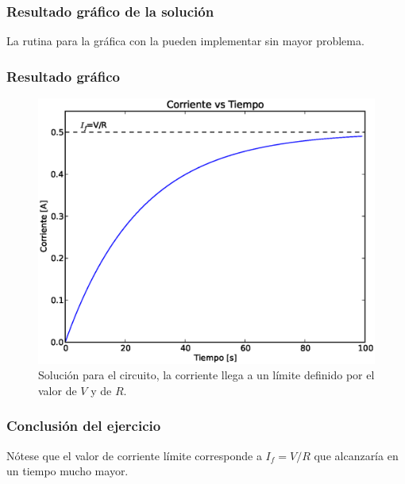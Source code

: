 \begin{frame}
\frametitle{Resultado gráfico de la solución}
La rutina para la gráfica con  la pueden implementar sin mayor problema.
\end{frame}
\begin{frame}
\frametitle{Resultado gráfico}
\begin{figure}
	\centering
	\includegraphics[scale=0.4]{Imagenes/RK2circuito.eps} 
    \caption{Solución para el circuito, la corriente llega a un límite definido por el valor de $V$ y de $R$.}
\end{figure}
\end{frame}
\begin{frame}
\frametitle{Conclusión del ejercicio}
Nótese que el valor de corriente límite corresponde a $I_{f} = V/R$ que alcanzaría en un tiempo mucho mayor.
\end{frame}
